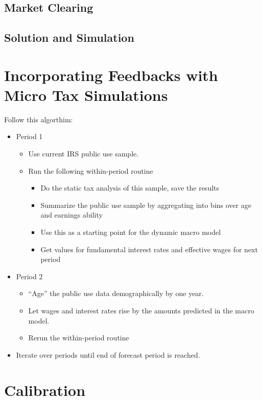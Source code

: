 \documentclass[letterpaper,12pt]{article}
\theoremstyle{definition}
\begin{document}
\begin{spacing}{1.5}
  \subsection{Market Clearing}

  \subsection{Solution and Simulation}

\newpage

\section{Incorporating Feedbacks with Micro Tax Simulations}\label{SecMicro}

  Follow this algorthim:
  \begin{itemize}
    \item Period 1
    \begin{itemize}
      \item Use current IRS public use sample.
      \item Run the following within-period routine
      \begin{itemize}
        \item Do the static tax analysis of this sample, save the results
        \item Summarize the public use sample by aggregating into bins over age and earnings ability
        \item Use this as a starting point for the dynamic macro model
        \item Get values for fundamental interest rates and effective wages for next period
      \end{itemize}
    \end{itemize}
  \item Period 2
    \begin{itemize}
      \item “Age” the public use data demographically by one year.
      \item Let wages and interest rates rise by the amounts predicted in the macro model.
      \item Rerun the within-period routine
    \end{itemize}
  \item Iterate over periods until end of forecast period is reached.
  \end{itemize}

\section{Calibration}

\end{spacing}
\end{document}
